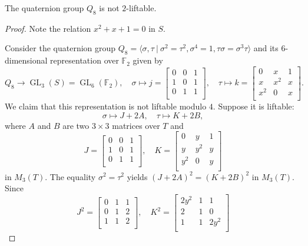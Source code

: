 \documentclass[10pt,a4paper]{amsart}
\newcommand{\F}{\mathbb{F}}
\newcommand{\GL}{\operatorname{GL}}
\begin{document}
\begin{proposition}\label{q8}
The quaternion group $Q_8$ is not $2$-liftable.
\end{proposition}

\begin{proof}

Note the relation $x^2+x+1=0$ in $S$.

Consider the quaternion group $Q_8=\langle \sigma, \tau\ |\ \sigma^2=\tau^2, \sigma^4=1, \tau\sigma=\sigma^3 \tau \rangle$ and its $6$-dimensional
representation over $\F_2$ given by
\[
 Q_8\to \GL_3(S)=\GL_6(\F_2),\quad \sigma\mapsto
j=\begin{bmatrix}
  0 &  0 & 1\\
 1 &  0 & 1\\
  0 &  1 & 1\\
\end{bmatrix}, \quad
 \tau\mapsto k=\begin{bmatrix}
0 &  x  & 1\\
 x &   {x}^2 &  x\\
{x}^2&   0 &  x \\
\end{bmatrix}.
 \]
 We claim that this representation is not liftable modulo $4$. Suppose it is liftable:
\[
\sigma\mapsto J+2  A,
\quad \tau\mapsto K+2 B,
\]
where $A$ and $B$ are two $3\times 3$ matrices over $T$ and
\[
J=\begin{bmatrix}
  0 &  0 & 1\\
 1 &  0 & 1\\
  0 &  1 & 1\\
\end{bmatrix},
\quad K=\begin{bmatrix}
0 &  y  & 1\\
  y &   {y}^2 &  y\\
{y}^2&   0 & y \\
\end{bmatrix}
\]
in $M_3(T)$.
The equality $\sigma^2=\tau^2$ yields $(J+2  A)^2= (K+2 B)^2$ in $M_3(T)$. Since
 \[
{J}^2=\begin{bmatrix}
  0 &  1 & 1\\
 0 &  1 & 2\\
  1 &  1 & 2\\
\end{bmatrix},
\quad {K}^2=\begin{bmatrix}
2{y}^2 &  1  & 1\\
  2 &   1 &  0\\
1 &  1 & 2{y}^2 \\

\end{bmatrix}\]
\end{proof}
\end{document}
